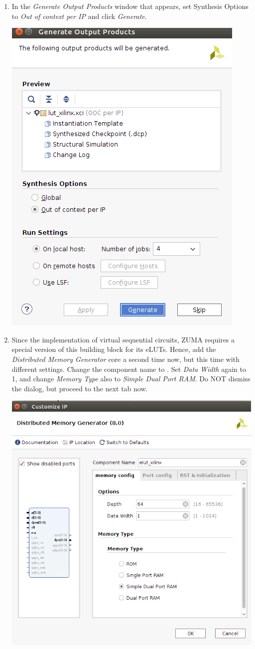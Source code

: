 \documentclass{article}
\newcommand{\hwport}[1]{\texttt{\detokenize{#1}}}
\begin{document}
\begin{enumerate}
    \clearpage
    \item In the \emph{Generate Output Products} window that appears, set Synthesis Options to \emph{Out of context per IP} and click \emph{Generate}. %

    \includegraphics[width=0.5\linewidth]{Figures/vivado12.png}

    \item Since the implementation of virtual sequential circuits, ZUMA requires a special version of this building block for its eLUTs. Hence, add the \emph{Distributed Memory Generator} core a second time now, but this time with different settings. Change the component name to \hwport{elut_xilinx}. Set \emph{Data Width} again to 1, and change \emph{Memory Type} also to \emph{Simple Dual Port RAM}. Do NOT dismiss the dialog, but proceed to the next tab now.

    \includegraphics[width=0.7\linewidth]{Figures/vivado13.png}


\end{enumerate}
\end{document}
